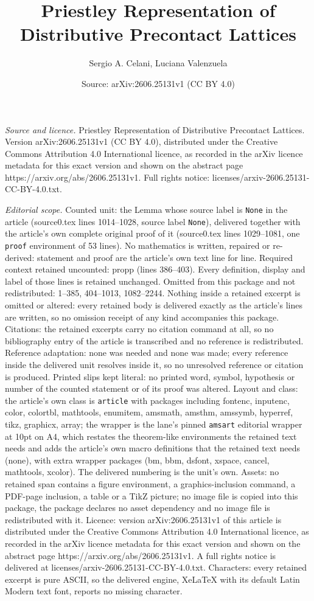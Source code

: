 \documentclass[10pt,a4paper]{amsart}
\title[Priestley Representation of Distributive Precontact Lattices]{Priestley Representation of Distributive Precontact Lattices}
\author{Sergio A. Celani, Luciana Valenzuela}
\date{Source: arXiv:2606.25131v1 (CC BY 4.0)}
\begin{document}
\maketitle

\noindent\emph{Source and licence.} Priestley Representation of Distributive Precontact Lattices. Version arXiv:2606.25131v1 (CC BY 4.0), distributed under the Creative Commons Attribution 4.0 International licence, as recorded in the arXiv licence metadata for this exact version and shown on the abstract page https://arxiv.org/abs/2606.25131v1. Full rights notice: licenses/arxiv-2606.25131-CC-BY-4.0.txt.\par\smallskip

\noindent\textit{Editorial scope.} Counted unit: the Lemma whose source label is \texttt{None} in the article (source0.tex lines 1014--1028, source label \texttt{None}), delivered together with the article's own complete original proof of it (source0.tex lines 1029--1081, one \texttt{proof} environment of 53 lines). No mathematics is written, repaired or re-derived: statement and proof are the article's own text line for line. Required context retained uncounted: propp (lines 386--403). Every definition, display and label of those lines is retained unchanged. Omitted from this package and not redistributed: 1--385, 404--1013, 1082--2244. Nothing inside a retained excerpt is omitted or altered: every retained body is delivered exactly as the article's lines are written, so no omission receipt of any kind accompanies this package. Citations: the retained excerpts carry no citation command at all, so no bibliography entry of the article is transcribed and no reference is redistributed. Reference adaptation: none was needed and none was made; every reference inside the delivered unit resolves inside it, so no unresolved reference or citation is produced. Printed slips kept literal: no printed word, symbol, hypothesis or number of the counted statement or of its proof was altered. Layout and class: the article's own class is \texttt{article} with packages including fontenc, inputenc, color, colortbl, mathtools, enumitem, amsmath, amsthm, amssymb, hyperref, tikz, graphicx, array; the wrapper is the lane's pinned \texttt{amsart} editorial wrapper at 10pt on A4, which restates the theorem-like environments the retained text needs and adds the article's own macro definitions that the retained text needs (none), with extra wrapper packages (bm, bbm, dsfont, xspace, cancel, mathtools, xcolor). The delivered numbering is the unit's own. Assets: no retained span contains a figure environment, a graphics-inclusion command, a PDF-page inclusion, a table or a TikZ picture; no image file is copied into this package, the package declares no asset dependency and no image file is redistributed with it. Licence: version arXiv:2606.25131v1 of this article is distributed under the Creative Commons Attribution 4.0 International licence, as recorded in the arXiv licence metadata for this exact version and shown on the abstract page https://arxiv.org/abs/2606.25131v1. A full rights notice is delivered at licenses/arxiv-2606.25131-CC-BY-4.0.txt. Characters: every retained excerpt is pure ASCII, so the delivered engine, XeLaTeX with its default Latin Modern text font, reports no missing character.
\end{document}
